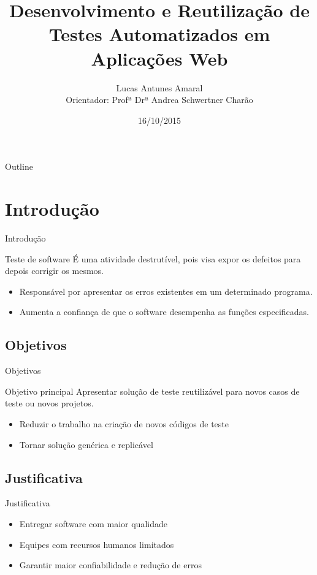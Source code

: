 \documentclass{beamer}
\title{Desenvolvimento e Reutilização de Testes Automatizados em Aplicações Web}
\author[Lucas Antunes Amaral]{Lucas Antunes Amaral\\Orientador: Profª Drª Andrea Schwertner Charão}
\institute[UFSM]{Ciência da Computação\\Universidade Federal de Santa Maria}
\date{16/10/2015}
\begin{document}
\begin{frame}
	\titlepage
\end{frame}

\begin{frame}{Outline}
  \tableofcontents
\end{frame}

\section{Introdução}
\begin{frame}{Introdução}
	\begin{block}{Teste de software}
	    É uma atividade destrutível, pois visa expor os defeitos para depois corrigir os mesmos.
	\end{block}
	\begin{itemize}
		\item Responsável por apresentar os erros existentes em um determinado programa.
		\item Aumenta a confiança de que o software desempenha as funções especificadas.
	\end{itemize}
\end{frame}

\subsection{Objetivos}
\begin{frame}{Objetivos}
    \begin{block}{Objetivo principal}
	    Apresentar solução de teste reutilizável para novos casos de teste ou novos projetos.
	\end{block}
	\begin{itemize}
		\item Reduzir o trabalho na criação de novos códigos de teste
		\item Tornar solução genérica e replicável
	\end{itemize}
\end{frame}

\subsection{Justificativa}
\begin{frame}{Justificativa}
	\begin{itemize}
		\item Entregar software com maior qualidade
		\item Equipes com recursos humanos limitados
		\item Garantir maior confiabilidade e redução de erros
	\end{itemize}
\end{frame}
\end{document}
